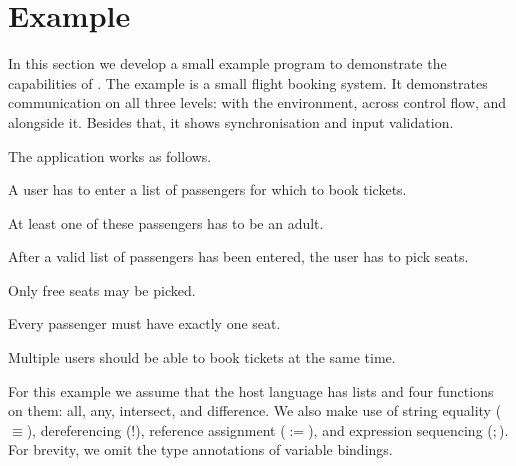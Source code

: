 


\section{Example}
\label{sec:example}

In this section we develop a small example program to demonstrate the capabilities of \TOPHAT.
The example is a small flight booking system.
It demonstrates communication on all three levels: with the environment, across control flow, and alongside it.
Besides that, it shows synchronisation and input validation.

The application works as follows.
\begin{enumerate*}
  \item A user has to enter a list of passengers for which to book tickets.
  \item At least one of these passengers has to be an adult.
  \item After a valid list of passengers has been entered, the user has to pick seats.
  \item Only free seats may be picked.
  \item Every passenger must have exactly one seat.
  \item Multiple users should be able to book tickets at the same time.
\end{enumerate*}
For this example we assume that the host language has lists and four functions on them: all, any, intersect, and difference.
We also make use of string equality ($\equiv$), dereferencing ($!$), reference assignment ($:=$), and expression sequencing ($;$).
For brevity, we omit the type annotations of variable bindings.



